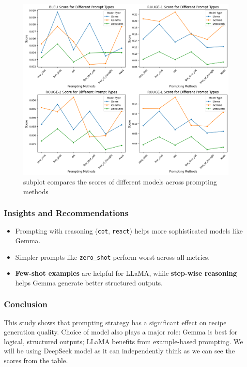 \documentclass[letterpaper,11pt]{report}
\begin{document}
\begin{figure}[h]
  \centering
  \includegraphics[width=\textwidth]{download.png}
  \caption{subplot compares the scores of different models
across prompting methods}
  \label{fig:Subplot Compares the score of different models across different prompts}
\end{figure}


\subsubsection{Insights and Recommendations}
\begin{itemize}
  \item Prompting with reasoning (\texttt{cot}, \texttt{react}) helps more sophisticated models like Gemma.
  \item Simpler prompts like \texttt{zero\_shot} perform worst across all metrics.
  \item \textbf{Few-shot examples} are helpful for LLaMA, while \textbf{step-wise reasoning} helps Gemma generate better structured outputs.
\end{itemize}

\subsubsection{Conclusion}
This study shows that prompting strategy has a significant effect on recipe generation quality. Choice of model also plays a major role: Gemma is best for logical, structured outputs; LLaMA benefits from example-based prompting. We will be using DeepSeek model as it can independently think as we can see the scores from the table. 
\end{document}
